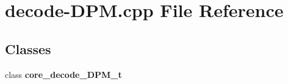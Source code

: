 \section{decode-DPM.cpp File Reference}
\label{decode-DPM_8cpp}
\subsection*{Classes}
\begin{CompactItemize}
\item 
class {\bf core\_\-decode\_\-DPM\_\-t}
\end{CompactItemize}
